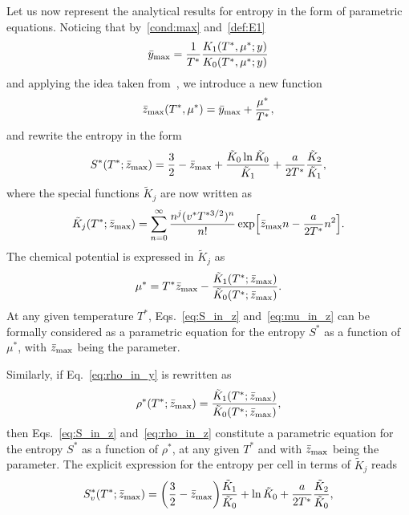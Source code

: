 \documentclass[entropy,article,submit,pdftex,moreauthors]{Definitions/mdpi}
\begin{document}
Let us now represent the analytical results for entropy in the form of parametric equations. Noticing that by~\eqref{cond:max} and~\eqref{def:E1}
\begin{equation}
	\bar{y}_{\rm max} = \frac{1}{T^*}\frac{K_1(T^*,\mu^*;y)}{K_0(T^*,\mu^*;y)}
\end{equation}
and applying the idea taken from~\citep{KD22}, we introduce a new function
\begin{equation}
	\bar{z}_{\rm max}(T^*,\mu^*) = \bar{y}_{\rm max} + \frac{\mu^*}{T^*},
\end{equation}
and rewrite the entropy in the form
\begin{equation}
	\label{eq:S_in_z}
	S^*(T^*;\bar{z}_{\rm max}) = \frac{3}{2} - \bar{z}_{\rm max} + \frac{\tilde{K}_0 \ln \tilde{K}_0}{\tilde{K}_1} + \frac{a}{2T^*} \frac{\tilde{K}_2}{\tilde{K}_1},
\end{equation}
where the special functions $\tilde{K}_j$ are now written as
\begin{equation}
	\tilde{K}_j(T^*;\bar{z}_{\rm max}) = \sum_{n=0}^{\infty} \frac{n^j (v^* T^{*3/2})^n}{n!} \exp[\bar{z}_{\rm max}n - \frac{a}{2T^*}n^2].
\end{equation}
The chemical potential is expressed in $\tilde{K}_j$ as
\begin{equation}
	\label{eq:mu_in_z}
	\mu^* = T^* \bar{z}_{\rm max} - \frac{\tilde{K}_1(T^*;\bar{z}_{\rm max})}{\tilde{K}_0(T^*;\bar{z}_{\rm max})}.
\end{equation}
At any given temperature $T^*$, Eqs.~\eqref{eq:S_in_z} and~\eqref{eq:mu_in_z} can be formally considered as a parametric equation for the entropy $S^*$ as a function of $\mu^*$, with $\bar{z}_{\rm max}$ being the parameter.

Similarly, if Eq.~\eqref{eq:rho_in_y} is rewritten as
\begin{equation}
	\label{eq:rho_in_z}
	\rho^*(T^*;\bar{z}_{\rm max}) = \frac{\tilde{K}_1(T^*;\bar{z}_{\rm max})}{\tilde{K}_0(T^*;\bar{z}_{\rm max})},
\end{equation}
then Eqs.~\eqref{eq:S_in_z} and~\eqref{eq:rho_in_z} constitute a parametric equation for the entropy $S^*$ as a function of $\rho^*$, at any given $T^*$ and with $\bar{z}_{\rm max}$ being the parameter.
The explicit expression for the entropy per cell in terms of $\tilde{K}_j$ reads
\begin{equation}
	\label{eq:S2_in_z}
	S^*_v(T^*;\bar{z}_{\rm max}) = \left(\frac{3}{2} - \bar{z}_{\rm max}\right) \frac{\tilde{K}_1}{\tilde{K}_0} + \ln \tilde{K}_0 + \frac{a}{2T^*} \frac{\tilde{K}_2}{\tilde{K}_0},
\end{equation}
\end{document}
